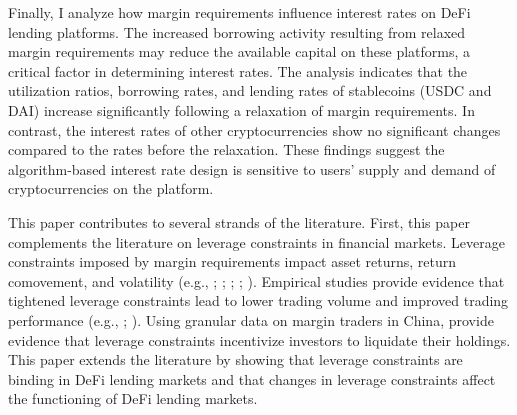 \documentclass[12pt]{article}
\begin{document}
Finally, I analyze how margin requirements influence interest rates on DeFi lending platforms. The increased borrowing activity resulting from relaxed margin requirements may reduce the available capital on these platforms, a critical factor in determining interest rates. The analysis indicates that the utilization ratios, borrowing rates, and lending rates of stablecoins (USDC and DAI) increase significantly following a relaxation of margin requirements. In contrast, the interest rates of other cryptocurrencies show no significant changes compared to the rates before the relaxation. These findings suggest the algorithm-based interest rate design is sensitive to users' supply and demand of cryptocurrencies on the platform. 
 
This paper contributes to several strands of the literature. First, this paper complements the literature on leverage constraints in financial markets. Leverage constraints imposed by margin requirements impact asset returns, return comovement, and volatility (e.g., \citealp{hardouvelis1990margin}; \citealp{hardouvelis2002asymmetric}; \citealp{kahraman2020margin}; \citealp{bian2021margin}; \citealp{chen2023pledgeability}). Empirical studies provide evidence that tightened leverage constraints lead to lower trading volume and improved trading performance (e.g., \citealp{heimer2019should}; \citealp{heimer2022biased}). Using granular data on margin traders in China, \cite{bian2021margin} provide evidence that leverage constraints incentivize investors to liquidate their holdings. This paper extends the literature by showing that leverage constraints are binding in DeFi lending markets and that changes in leverage constraints affect the functioning of DeFi lending markets.
\end{document}
